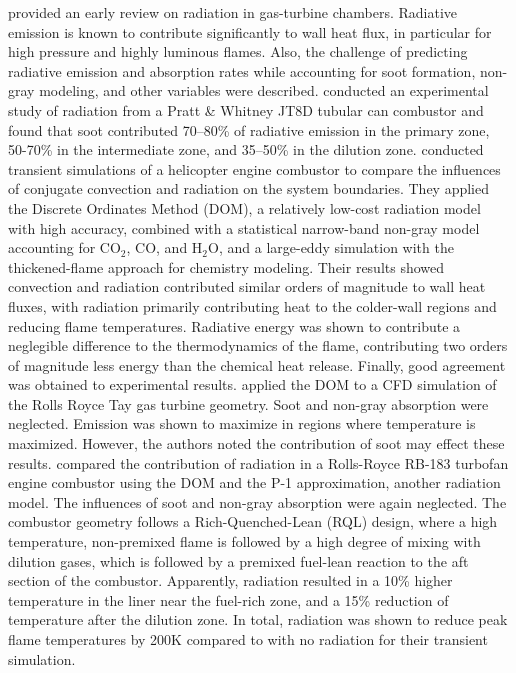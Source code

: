 \citet{Lefebvre1984FlameChambers} provided an early review on radiation in gas-turbine chambers. Radiative emission is known to contribute significantly to wall heat flux, in particular for high pressure and highly luminous flames. Also, the challenge of predicting radiative emission and absorption rates while accounting for soot formation, non-gray modeling, and other variables were described. \citet{Claus1981SpectralCombustor} conducted an experimental study of radiation from a Pratt \& Whitney JT8D tubular can combustor and found that soot contributed 70–80\% of radiative emission in the primary zone, 50-70\% in the intermediate zone, and 35–50\% in the dilution zone.
\citet{Berger2016OnLoads} conducted transient simulations of a helicopter engine combustor to compare the influences of conjugate convection and radiation on the system boundaries. They applied the Discrete Ordinates Method (DOM), a relatively low-cost radiation model with high accuracy, combined with a statistical narrow-band non-gray model accounting for CO$_2$, CO, and H$_2$O, and a large-eddy simulation with the thickened-flame approach for chemistry modeling. Their results showed convection and radiation contributed similar orders of magnitude to wall heat fluxes, with radiation primarily contributing heat to the colder-wall regions and reducing flame temperatures. Radiative energy was shown to contribute a neglegible difference to the thermodynamics of the flame, contributing two orders of magnitude less energy than the chemical heat release. Finally, good agreement was obtained to experimental results. 
\citet{Paul2006RadiativeCombustor} applied the DOM to a CFD simulation of the Rolls Royce Tay gas turbine geometry. Soot and non-gray absorption were neglected. Emission was shown to maximize in regions where temperature is maximized. However, the authors noted the contribution of soot may effect these results.
\citet{Gamil2020AssessmentChamber} compared the contribution of radiation in a Rolls-Royce RB-183 turbofan engine combustor using the DOM and the P-1 approximation, another radiation model. The influences of soot and non-gray absorption were again neglected.
The combustor geometry follows a Rich-Quenched-Lean (RQL) design, where a high temperature, non-premixed flame is followed by a high degree of mixing with dilution gases, which is followed by a premixed fuel-lean reaction to the aft section of the combustor.
Apparently, radiation resulted in a 10\% higher temperature in the liner near the fuel-rich zone, and a 15\% reduction of temperature after the dilution zone.
In total, radiation was shown to reduce peak flame temperatures by 200K compared to with no radiation for their transient simulation.
